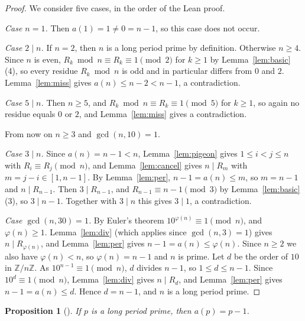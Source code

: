 \documentclass[11pt]{amsart}
\theoremstyle{plain}
\newtheorem{proposition}[theorem]{Proposition}
\theoremstyle{definition}
\newcommand{\Z}{\mathbb{Z}}
\begin{document}
\begin{proof}
We consider five cases, in the order of the Lean proof.

\emph{Case $n=1$.} Then $a(1)=1\ne0=n-1$, so this case does not occur.

\emph{Case $2\mid n$.} If $n=2$, then $n$ is a long period prime by definition. Otherwise $n\ge4$. Since $n$ is even, $R_k\bmod n\equiv R_k\equiv1\pmod 2$ for $k\ge1$ by Lemma~\ref{lem:basic}(4), so every residue $R_k\bmod n$ is odd and in particular differs from $0$ and $2$. Lemma~\ref{lem:miss} gives $a(n)\le n-2<n-1$, a contradiction.

\emph{Case $5\mid n$.} Then $n\ge5$, and $R_k\bmod n\equiv R_k\equiv1\pmod5$ for $k\ge1$, so again no residue equals $0$ or $2$, and Lemma~\ref{lem:miss} gives a contradiction.

From now on $n\ge3$ and $\gcd(n,10)=1$.

\emph{Case $3\mid n$.} Since $a(n)=n-1<n$, Lemma~\ref{lem:pigeon} gives $1\le i<j\le n$ with $R_i\equiv R_j\pmod n$, and Lemma~\ref{lem:cancel} gives $n\mid R_m$ with $m=j-i\in[1,n-1]$. By Lemma~\ref{lem:per}, $n-1=a(n)\le m$, so $m=n-1$ and $n\mid R_{n-1}$. Then $3\mid R_{n-1}$, and $R_{n-1}\equiv n-1\pmod 3$ by Lemma~\ref{lem:basic}(3), so $3\mid n-1$. Together with $3\mid n$ this gives $3\mid1$, a contradiction.

\emph{Case $\gcd(n,30)=1$.} By Euler's theorem $10^{\varphi(n)}\equiv1\pmod n$, and $\varphi(n)\ge1$. Lemma~\ref{lem:div} (which applies since $\gcd(n,3)=1$) gives $n\mid R_{\varphi(n)}$, and Lemma~\ref{lem:per} gives $n-1=a(n)\le\varphi(n)$. Since $n\ge2$ we also have $\varphi(n)<n$, so $\varphi(n)=n-1$ and $n$ is prime. Let $d$ be the order of $10$ in $\Z/n\Z$. As $10^{n-1}\equiv1\pmod n$, $d$ divides $n-1$, so $1\le d\le n-1$. Since $10^d\equiv1\pmod n$, Lemma~\ref{lem:div} gives $n\mid R_d$, and Lemma~\ref{lem:per} gives $n-1=a(n)\le d$. Hence $d=n-1$, and $n$ is a long period prime.
\end{proof}

\begin{proposition}[]\label{prop:backward}
If $p$ is a long period prime, then $a(p)=p-1$.
\end{proposition}
\end{document}
